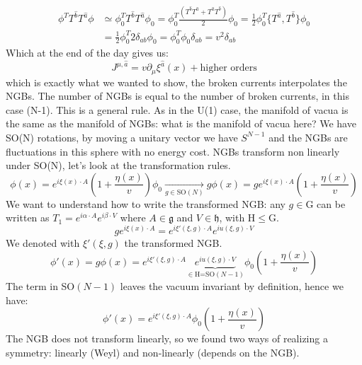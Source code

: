 \documentclass[../main.tex]{subfiles}
\begin{document}
\begin{example}
\begin{align*}
\phi^TT^{\hat{b}}T^{\hat{a}}\phi&\simeq\phi_0^TT^{\hat{b}}T^{\hat{a}}\phi_0=\phi_0^T\frac{(T^{\hat{b}}T^{\hat{a}}+T^{\hat{a}}T^{\hat{b}})}{2}\phi_0=\frac{1}{2}\phi_0^T\{T^{\hat{a}},T^{\hat{b}}\}\phi_0\\
&=\frac{1}{2}\phi_0^T2\delta_{ab}\phi_0=\phi_0^T\phi_0\delta_{ab}=v^2\delta_{ab}
\end{align*}
Which at the end of the day gives us:
\[
J^{\mu,\hat{a}}=v\partial_\mu\xi^{\hat{a}}(x)+\text{higher orders}
\]
which is exactly what we wanted to show, the broken currents interpolates the NGBs. The number of NGBs is equal to the number of broken currents, in this case (N-1). This is a general rule. As in the U(1) case, the manifold of vacua is the same as the manifold of NGBs: what is the manifold of vacua here? We have SO(N) rotations, by moving a unitary vector we have $S^{N-1}$ and the NGBs are fluctuations in this sphere with no energy cost. NGBs transform non linearly under SO(N), let's look at the transformation rules.
\[
\phi(x)=e^{i\xi(x)\cdot A}\left(1+\frac{\eta(x)}{v}\right)\phi_0\xrightarrow[g\in\text{SO}(N)]{}g\phi(x)=ge^{i\xi(x)\cdot A}\left(1+\frac{\eta(x)}{v}\right)
\]
We want to understand how to write the transformed NGB: any $g\in$G can be written as $T_1=e^{i\alpha\cdot A}e^{i\beta\cdot V}$ where $A\in\mathfrak{g}$ and $V\in\mathfrak{h}$, with H$\le$G.
\[
ge^{i\xi(x)\cdot A}=e^{i\xi'(\xi,g)\cdot A}e^{iu(\xi,g)\cdot V}
\]
We denoted with $\xi'(\xi,g)$ the transformed NGB.
\[
\phi'(x)=g\phi(x)=e^{i\xi'(\xi,g)\cdot A}\underbrace{e^{iu(\xi,g)\cdot V}}_{\in\text{H=SO}(N-1)}\phi_0\left(1+\frac{\eta(x)}{v}\right)
\]
The term in SO$(N-1)$ leaves the vacuum invariant by definition, hence we have:
\[
\phi'(x)=e^{i\xi'(\xi,g)\cdot A}\phi_0\left(1+\frac{\eta(x)}{v}\right)
\]
The NGB does not transform linearly, so we found two ways of realizing a symmetry: linearly (Weyl) and non-linearly (depends on the NGB).
\end{example}
\end{document}
